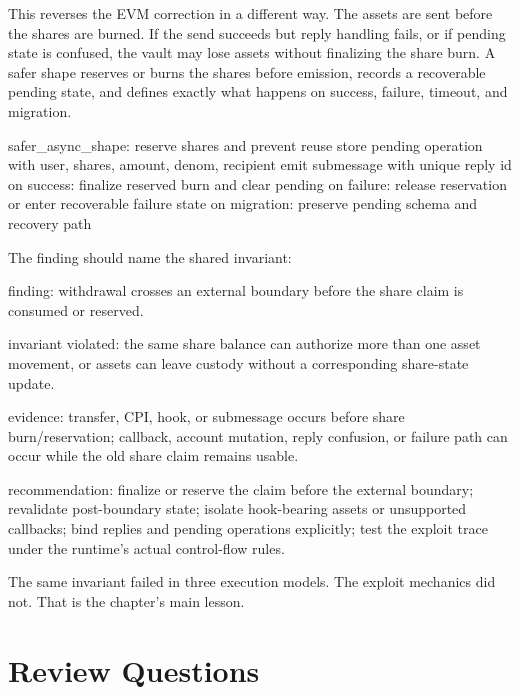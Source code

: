 This reverses the EVM correction in a different way. The assets are sent before the shares are burned. If the send succeeds but reply handling fails, or if pending state is confused, the vault may lose assets without finalizing the share burn. A safer shape reserves or burns the shares before emission, records a recoverable pending state, and defines exactly what happens on success, failure, timeout, and migration.

\begin{codeblock}
safer_async_shape:
    reserve shares and prevent reuse
    store pending operation with user, shares, amount, denom, recipient
    emit submessage with unique reply id
    on success: finalize reserved burn and clear pending
    on failure: release reservation or enter recoverable failure state
    on migration: preserve pending schema and recovery path
\end{codeblock}

The finding should name the shared invariant:

\begin{codeblock}
finding:
    withdrawal crosses an external boundary before the share claim is
    consumed or reserved.

invariant violated:
    the same share balance can authorize more than one asset movement,
    or assets can leave custody without a corresponding share-state update.

evidence:
    transfer, CPI, hook, or submessage occurs before share burn/reservation;
    callback, account mutation, reply confusion, or failure path can occur
    while the old share claim remains usable.

recommendation:
    finalize or reserve the claim before the external boundary;
    revalidate post-boundary state;
    isolate hook-bearing assets or unsupported callbacks;
    bind replies and pending operations explicitly;
    test the exploit trace under the runtime's actual control-flow rules.
\end{codeblock}

The same invariant failed in three execution models. The exploit mechanics did not. That is the chapter's main lesson.

\section*{Review Questions}


